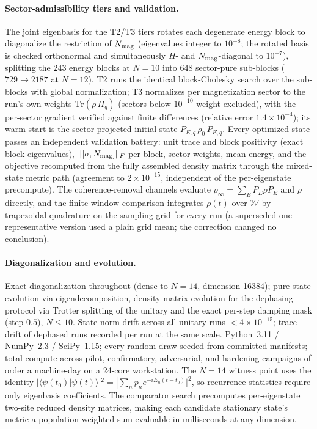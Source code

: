 \documentclass[a4paper,11pt,noarxiv]{quantumarticle}
\begin{document}
\paragraph{Sector-admissibility tiers and validation.} The joint
eigenbasis for the T2/T3 tiers rotates each degenerate energy block
to diagonalize the restriction of $N_{\rm mag}$ (eigenvalues
integer to $10^{-8}$; the rotated basis is checked orthonormal and
simultaneously $H$- and $N_{\rm mag}$-diagonal to $10^{-7}$),
splitting the $243$ energy blocks at $N{=}10$ into $648$ sector-pure
sub-blocks ($729 \to 2187$ at $N{=}12$). T2 runs the identical
block-Cholesky search over the sub-blocks with global normalization;
T3 normalizes per magnetization sector to the run's own weights
$\mathrm{Tr}(\rho\,\Pi_q)$ (sectors below $10^{-10}$ weight excluded),
with the per-sector gradient verified against finite differences
(relative error $1.4\times10^{-4}$); its warm start is the
sector-projected initial state $P_{E,q}\,\rho_0\,P_{E,q}$. Every
optimized state passes an independent validation battery: unit trace
and block positivity (exact block eigenvalues), $\lVert[\sigma,
N_{\rm mag}]\rVert_F$ per block, sector weights, mean energy, and the
objective recomputed from the fully assembled density matrix through
the mixed-state metric path (agreement to $2\times10^{-15}$,
independent of the per-eigenstate precompute). The coherence-removal
channels evaluate $\rho_\infty = \sum_E P_E\rho P_E$ and $\bar\rho$
directly, and the finite-window comparison integrates $\rho(t)$ over
$\mathcal{W}$ by trapezoidal quadrature on the sampling grid for
every run (a superseded one-representative version used a plain grid
mean; the correction changed no conclusion).

\paragraph{Diagonalization and evolution.}
Exact diagonalization throughout (dense to $N=14$, dimension 16384);
pure-state evolution via eigendecomposition, density-matrix evolution
for the dephasing protocol via Trotter splitting of the unitary and the
exact per-step damping mask (step $0.5$), $N \leq 10$. State-norm drift
across all unitary runs $< 4\times10^{-15}$; trace drift of dephased
runs recorded per run at the same scale. Python~3.11 / NumPy~2.3 /
SciPy~1.15; every random draw seeded from committed manifests; total
compute across pilot, confirmatory, adversarial, and hardening
campaigns of order a machine-day on a 24-core workstation. The $N=14$
witness point uses the identity $|\langle\psi(t_0)|\psi(t)\rangle|^2 =
|\sum_n p_n e^{-iE_n(t-t_0)}|^2$, so recurrence statistics require only
eigenbasis coefficients. The comparator search precomputes
per-eigenstate two-site reduced density matrices, making each candidate
stationary state's metric a population-weighted sum evaluable in
milliseconds at any dimension.
\end{document}
